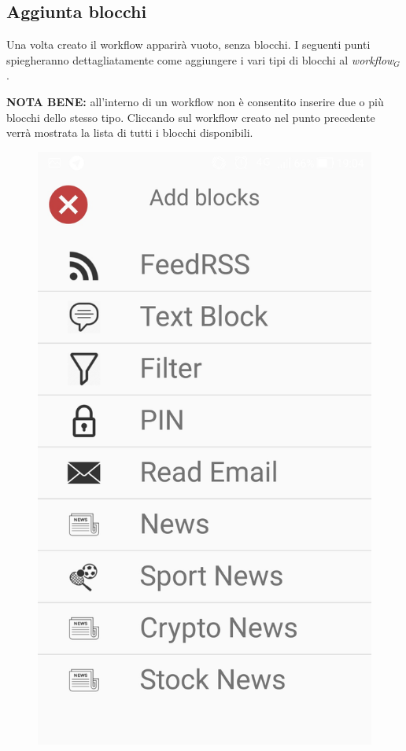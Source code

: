 \newpage
\subsection{Aggiunta blocchi}
Una volta creato il workflow apparirà vuoto, senza blocchi.
I seguenti punti spiegheranno dettagliatamente come aggiungere i vari tipi di blocchi al \textit{workflow$_{G}$}.

\textbf{NOTA BENE:} all'interno di un workflow non è consentito inserire due o più blocchi dello stesso tipo.
Cliccando sul workflow creato nel punto precedente verrà mostrata la lista di tutti i blocchi disponibili.

\begin{figure}[!ht]
	\centering
	\includegraphics[scale=0.2]{images/ListBlocks.jpg}
	\caption{}
\end{figure}


